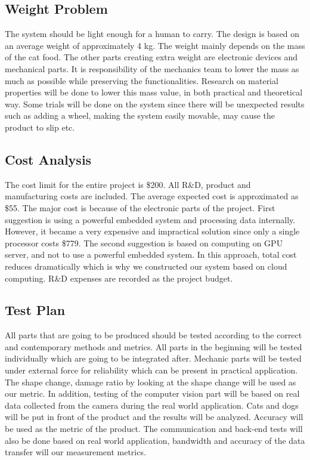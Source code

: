 \subsection{Weight Problem}
The system should be light enough for a human to carry. The design is based on an average weight of approximately 4 kg. The weight mainly depends on the mass of the cat food. The other parts creating extra weight are electronic devices and mechanical parts. It is responsibility of the mechanics team to lower the mass as much as possible while preserving the functionalities. Research on material properties will be done to lower this mass value, in both practical and theoretical way. Some trials will be done on the system since there will be unexpected results such as adding a wheel, making the system easily movable, may cause the product to slip etc.

\subsection{Cost Analysis}
The cost limit for the entire project is \$200. All R\&D, product and manufacturing costs are included. The average expected cost is approximated as \$55. The major cost is because of the electronic parts of the project. First suggestion is using a powerful embedded system and processing data internally. However, it became a very expensive and impractical solution since only a single processor costs \$779. The second suggestion is based on computing on GPU server, and not to use a powerful embedded system. In this approach, total cost reduces dramatically which is why we constructed our system based on cloud computing. R\&D expenses are recorded as the project budget.

\subsection{Test Plan}
All parts that are going to be produced should be tested according to the correct and contemporary methods and metrics. All parts in the beginning will be tested individually which are going to be integrated after. Mechanic parts will be tested under external force for reliability which can be present in practical application. The shape change, damage ratio by looking at the shape change will be used as our metric. In addition, testing of the computer vision part will be based on real data collected from the camera during the real world application. Cats and dogs will be put in front of the product and the results will be analyzed. Accuracy will be used as the metric of the product. The communication and back-end tests will also be done based on real world application, bandwidth and accuracy of the data transfer will our measurement metrics.


